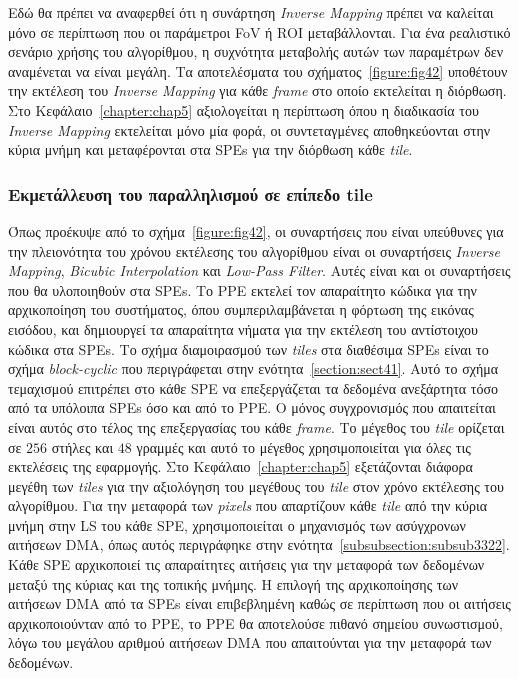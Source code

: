 Εδώ θα πρέπει να αναφερθεί ότι η συνάρτηση \textsl{Inverse Mapping} πρέπει να καλείται μόνο σε περίπτωση που οι παράμετροι \ac{FoV} ή \ac{ROI} μεταβάλλονται. Για ένα ρεαλιστικό σενάριο χρήσης του αλγορίθμου, η συχνότητα μεταβολής αυτών των παραμέτρων δεν αναμένεται να είναι μεγάλη. Τα αποτελέσματα του σχήματος~\ref{figure:fig42} υποθέτουν την εκτέλεση του \textsl{Inverse Mapping} για κάθε \textsl{frame} στο οποίο εκτελείται η διόρθωση. Στο Κεφάλαιο~\ref{chapter:chap5} αξιολογείται η περίπτωση όπου η διαδικασία του \textsl{Inverse Mapping} εκτελείται μόνο μία φορά, οι συντεταγμένες αποθηκεύονται στην κύρια μνήμη και μεταφέρονται στα \acp{SPE} για την διόρθωση κάθε \textsl{tile}.

\subsubsection{Εκμετάλλευση του παραλληλισμού σε επίπεδο tile}
\label{subsubsection:subsub4122}
\indent
Όπως προέκυψε από το σχήμα~\ref{figure:fig42}, οι συναρτήσεις που είναι υπεύθυνες για την πλειονότητα του χρόνου εκτέλεσης του αλγορίθμου είναι οι συναρτήσεις \textsl{Inverse Mapping}, \textsl{Bicubic Interpolation} και \textsl{Low-Pass Filter}. Αυτές είναι και οι συναρτήσεις που θα υλοποιηθούν στα \acp{SPE}. Το \ac{PPE} εκτελεί τον απαραίτητο κώδικα για την αρχικοποίηση του συστήματος, όπου συμπεριλαμβάνεται η φόρτωση της εικόνας εισόδου, και δημιουργεί τα απαραίτητα νήματα για την εκτέλεση του αντίστοιχου κώδικα στα \acp{SPE}.\newline \indent
Το σχήμα διαμοιρασμού των \textsl{tiles} στα διαθέσιμα \acp{SPE} είναι το σχήμα \textsl{block-cyclic} που περιγράφεται στην ενότητα~\ref{section:sect41}. Αυτό το σχήμα τεμαχισμού επιτρέπει στο κάθε \ac{SPE} να επεξεργάζεται τα δεδομένα ανεξάρτητα τόσο από τα υπόλοιπα \acp{SPE} όσο και από το \ac{PPE}. Ο μόνος συγχρονισμός που απαιτείται είναι αυτός στο τέλος της επεξεργασίας του κάθε \textsl{frame}. Το μέγεθος του \textsl{tile} ορίζεται σε \(256\) στήλες και \(48\) γραμμές και αυτό το μέγεθος χρησιμοποιείται για όλες τις εκτελέσεις της εφαρμογής. Στο Κεφάλαιο~\ref{chapter:chap5} εξετάζονται διάφορα μεγέθη των \textsl{tiles} για την αξιολόγηση του μεγέθους του \textsl{tile} στον χρόνο εκτέλεσης του αλγορίθμου.\newline \indent
Για την μεταφορά των \textsl{pixels} που απαρτίζουν κάθε \textsl{tile} από την κύρια μνήμη στην \ac{LS} του κάθε \ac{SPE}, χρησιμοποιείται ο μηχανισμός των ασύγχρονων αιτήσεων \ac{DMA}, όπως αυτός περιγράφηκε στην ενότητα~\ref{subsubsection:subsub3322}. Κάθε \ac{SPE} αρχικοποιεί τις απαραίτητες αιτήσεις για την μεταφορά των δεδομένων μεταξύ της κύριας και της τοπικής μνήμης. Η επιλογή της αρχικοποίησης των αιτήσεων \ac{DMA} από τα \acp{SPE} είναι επιβεβλημένη καθώς σε περίπτωση που οι αιτήσεις αρχικοποιούνταν από το \ac{PPE}, το \ac{PPE} θα αποτελούσε πιθανό σημείου συνωστισμού, λόγω του μεγάλου αριθμού αιτήσεων \ac{DMA} που απαιτούνται για την μεταφορά των δεδομένων.\newline \indent
